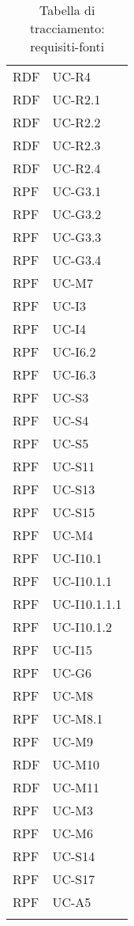 \begin{longtable}{| p{5cm} | p{5cm} |}
		RDF & UC-R4\\
		\rowcolor{LightGray}
		RDF & UC-R2.1\\
		RDF & UC-R2.2\\
		\rowcolor{LightGray}
		RDF & UC-R2.3\\
		RDF & UC-R2.4\\
		\rowcolor{LightGray}
		RPF & UC-G3.1\\
		\rowcolor{LightGray}
		RPF & UC-G3.2\\
		RPF & UC-G3.3\\
		RPF & UC-G3.4\\
		\rowcolor{LightGray}
		RPF & UC-M7\\
		RPF & UC-I3\\
		\rowcolor{LightGray}
		RPF & UC-I4\\
		RPF & UC-I6.2\\
		\rowcolor{LightGray}
		RPF & UC-I6.3\\
		RPF & UC-S3\\
		\rowcolor{LightGray}
		RPF & UC-S4\\
		RPF & UC-S5\\
		\rowcolor{LightGray}
		RPF & UC-S11\\
		RPF & UC-S13\\
		\rowcolor{LightGray}
		RPF & UC-S15\\
		RPF & UC-M4\\
		\rowcolor{LightGray}
		RPF & UC-I10.1\\
		RPF & UC-I10.1.1\\
		RPF & UC-I10.1.1.1\\
		RPF & UC-I10.1.2\\
		\rowcolor{LightGray}
		RPF & UC-I15\\
		\rowcolor{LightGray}
		RPF & UC-G6\\
		RPF & UC-M8\\
		RPF & UC-M8.1\\
		\rowcolor{LightGray}
		RPF & UC-M9\\
		RDF & UC-M10\\
		RDF & UC-M11\\
		RPF & UC-M3\\
		\rowcolor{LightGray}
		RPF & UC-M6\\
		RPF & UC-S14\\	
		\rowcolor{LightGray}
		RPF & UC-S17\\
		RPF & UC-A5\\
		\rowcolor{LightGray}
		\hline
		\caption{Tabella di tracciamento: requisiti-fonti}
\end{longtable}

